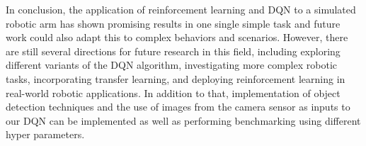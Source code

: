 \documentclass[12pt,oneside]{article}
\begin{document}
In conclusion, the application of reinforcement learning and DQN to a simulated robotic arm has shown promising results in one single simple task and future work could also adapt this to complex behaviors and scenarios. However, there are still several directions for future research in this field, including exploring different variants of the DQN algorithm, investigating more complex robotic tasks, incorporating transfer learning, and deploying reinforcement learning in real-world robotic applications. In addition to that, implementation of object detection techniques and the use of images from the camera sensor as inputs to our DQN can be implemented as well as performing benchmarking using different hyper parameters.


%
%
\end{document}
